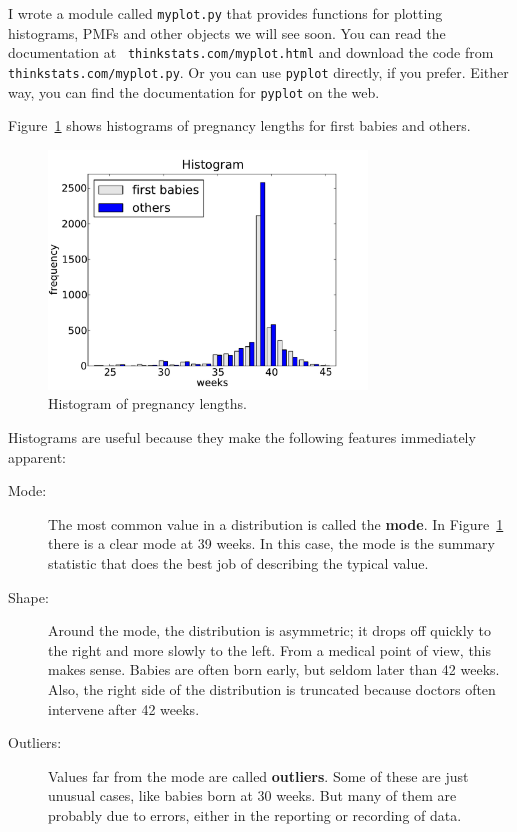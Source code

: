 \documentclass[12pt]{book}
\begin{document}
I wrote a module called {\tt myplot.py} that provides functions
for plotting histograms, PMFs and other objects we will see soon.
You can read the documentation at {\tt
  thinkstats.com/myplot.html} and download the code from {\tt
  thinkstats.com/myplot.py}.  Or you can use
{\tt pyplot} directly, if you prefer.  Either way, you can find
the documentation for {\tt pyplot} on the web.

Figure~\ref{nsfg_hist} shows histograms of pregnancy lengths for
first babies and others.

\begin{figure}
\centerline{\includegraphics[height=2.5in]{figs/nsfg_hist.pdf}}
\caption{Histogram of pregnancy lengths.}
\label{nsfg_hist}
\end{figure}

Histograms are useful because they make the following features immediately
apparent:

\begin{description}

\item[Mode:] The most common value in a distribution is called the
  {\bf mode}.  In Figure~\ref{nsfg_hist} there is a clear mode at 39
  weeks.  In this case, the mode is the summary statistic that does
  the best job of describing the typical value.

\item[Shape:] Around the mode, the distribution is asymmetric; it
  drops off quickly to the right and more slowly to the left.  From a
  medical point of view, this makes sense.  Babies are often born
  early, but seldom later than 42 weeks.  Also, the right side of the
  distribution is truncated because doctors often intervene after 42
  weeks.

\item[Outliers:] Values far from the mode are called {\bf outliers}.
  Some of these are just unusual cases, like babies born at 30 weeks.
  But many of them are probably due to errors, either in the reporting
  or recording of data.

\end{description}
\end{document}
